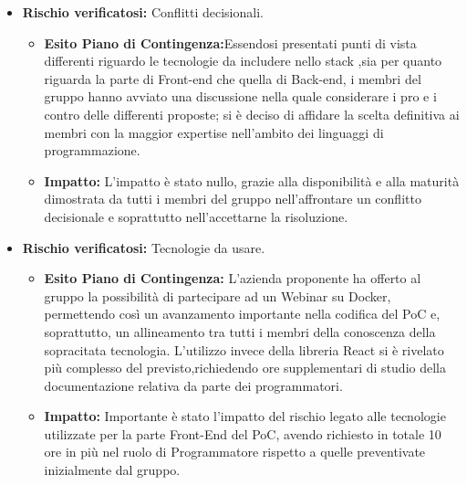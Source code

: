 \begin{itemize}
\item \textbf{Rischio verificatosi:} Conflitti decisionali.

\begin{itemize}
\item \textbf{Esito Piano di Contingenza:}Essendosi presentati punti di vista differenti riguardo le tecnologie da includere nello stack ,sia per quanto riguarda la parte di Front-end  che quella di Back-end, i membri del gruppo 
hanno avviato una discussione nella quale considerare i pro e i contro delle differenti proposte; si è deciso di 
affidare la scelta definitiva ai membri con la maggior expertise nell'ambito dei linguaggi di programmazione.
\item \textbf{Impatto:} L'impatto è stato nullo, grazie alla disponibilità e alla maturità dimostrata da tutti i membri del gruppo
nell'affrontare un conflitto decisionale e soprattutto nell'accettarne la risoluzione.  
\end{itemize}

\item \textbf{Rischio verificatosi:} Tecnologie da usare.
\begin{itemize}
\item \textbf{Esito Piano di Contingenza:} L'azienda proponente ha offerto al gruppo la possibilità di partecipare ad un Webinar
su Docker, permettendo così un avanzamento 
importante nella codifica del PoC e, soprattutto, un allineamento tra tutti i membri della conoscenza della sopracitata tecnologia.
L'utilizzo invece della libreria React si è rivelato più complesso del previsto,richiedendo ore supplementari di studio della documentazione relativa
da parte dei programmatori.\\
\item \textbf{Impatto:} Importante è stato l'impatto del rischio legato alle tecnologie utilizzate per la parte Front-End del PoC,
avendo richiesto in totale 10 ore in più nel ruolo di Programmatore rispetto a quelle preventivate inizialmente dal gruppo.\\
\end{itemize}


\end{itemize}
